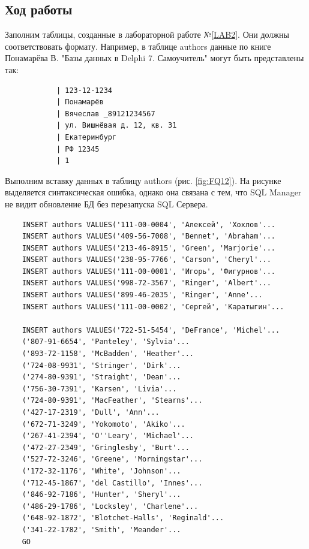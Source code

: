 \subsection{Ход работы}
Заполним таблицы, созданные в лабораторной работе №\ref{LAB2}. Они должны соответствовать формату. Например, в таблице authors данные по книге Понамарёва В. "Базы данных в Delphi 7. Самоучитель" могут быть представлены так:
\begin{verbatim}
            | 123-12-1234 
            | Понамарёв 
            | Вячеслав _89121234567 
            | ул. Вишнёвая д. 12, кв. 31 
            | Екатеринбург 
            | РФ 12345 
            | 1
\end{verbatim}
Выполним вставку данных в таблицу authors (рис. \ref{fig:FQ12}). На рисунке выделяется синтаксическая ошибка, однако она связана с тем, что SQL Manager не видит обновление БД без перезапуска SQL Сервера.
\begin{verbatim}
    INSERT authors VALUES('111-00-0004', 'Алексей', 'Хохлов'...
    INSERT authors VALUES('409-56-7008', 'Bennet', 'Abraham'...
    INSERT authors VALUES('213-46-8915', 'Green', 'Marjorie'...
    INSERT authors VALUES('238-95-7766', 'Carson', 'Cheryl'...
    INSERT authors VALUES('111-00-0001', 'Игорь', 'Фигурнов'...
    INSERT authors VALUES('998-72-3567', 'Ringer', 'Albert'...
    INSERT authors VALUES('899-46-2035', 'Ringer', 'Anne'...
    INSERT authors VALUES('111-00-0002', 'Сергей', 'Каратыгин'...
    
    INSERT authors VALUES('722-51-5454', 'DeFrance', 'Michel'...
    ('807-91-6654', 'Panteley', 'Sylvia'...
    ('893-72-1158', 'McBadden', 'Heather'...
    ('724-08-9931', 'Stringer', 'Dirk'...
    ('274-80-9391', 'Straight', 'Dean'...
    ('756-30-7391', 'Karsen', 'Livia'...
    ('724-80-9391', 'MacFeather', 'Stearns'...
    ('427-17-2319', 'Dull', 'Ann'...
    ('672-71-3249', 'Yokomoto', 'Akiko'...
    ('267-41-2394', 'O''Leary', 'Michael'...
    ('472-27-2349', 'Gringlesby', 'Burt'...
    ('527-72-3246', 'Greene', 'Morningstar'...
    ('172-32-1176', 'White', 'Johnson'...
    ('712-45-1867', 'del Castillo', 'Innes'...
    ('846-92-7186', 'Hunter', 'Sheryl'...
    ('486-29-1786', 'Locksley', 'Charlene'...
    ('648-92-1872', 'Blotchet-Halls', 'Reginald'...
    ('341-22-1782', 'Smith', 'Meander'...
    GO
\end{verbatim}
